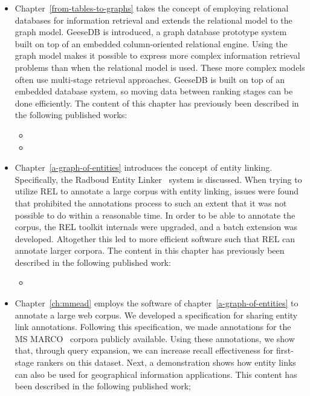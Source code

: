 \begin{itemize}
	\item Chapter~\ref{from-tables-to-graphs} takes the concept of employing relational databases for information retrieval and extends the relational model to the graph model. GeeseDB is introduced, a graph database prototype system built on top of an embedded column-oriented relational engine. Using the graph model makes it possible to express more complex information retrieval problems than when the relational model is used. These more complex models often use multi-stage retrieval approaches. GeeseDB is built on top of an embedded database system, so moving data between ranking stages can be done efficiently. The content of this chapter has previously been described in the following published works:
	
	{
		\scriptsize
		\begin{itemize}
			\item {}
			\item {}
		\end{itemize}
	}
	
	\item Chapter~\ref{a-graph-of-entities} introduces the concept of entity linking. Specifically, the Radboud Entity Linker~\citep{rel} system is discussed. When trying to utilize REL to annotate a large corpus with entity linking, issues were found that prohibited the annotations process to such an extent that it was not possible to do within a reasonable time. In order to be able to annotate the corpus, the REL toolkit internals were upgraded, and a batch extension was developed. Altogether this led to more efficient software such that REL can annotate larger corpora. The content in this chapter has previously been described in the following published work: 
	
	{
		\scriptsize
		\begin{itemize}
			\item {}
		\end{itemize}
	}
	
	\item Chapter~\ref{ch:mmead} employs the software of chapter~\ref{a-graph-of-entities} to annotate a large web corpus. We developed a specification for sharing entity link annotations. Following this specification, we made annotations for the MS MARCO~\citep{msmarco} corpora publicly available. Using these annotations, we show that, through query expansion, we can increase recall effectiveness for first-stage rankers on this dataset. Next, a demonstration shows how entity links can also be used for geographical information applications. 
	This content has been described in the following published work; 
	

\end{itemize}
